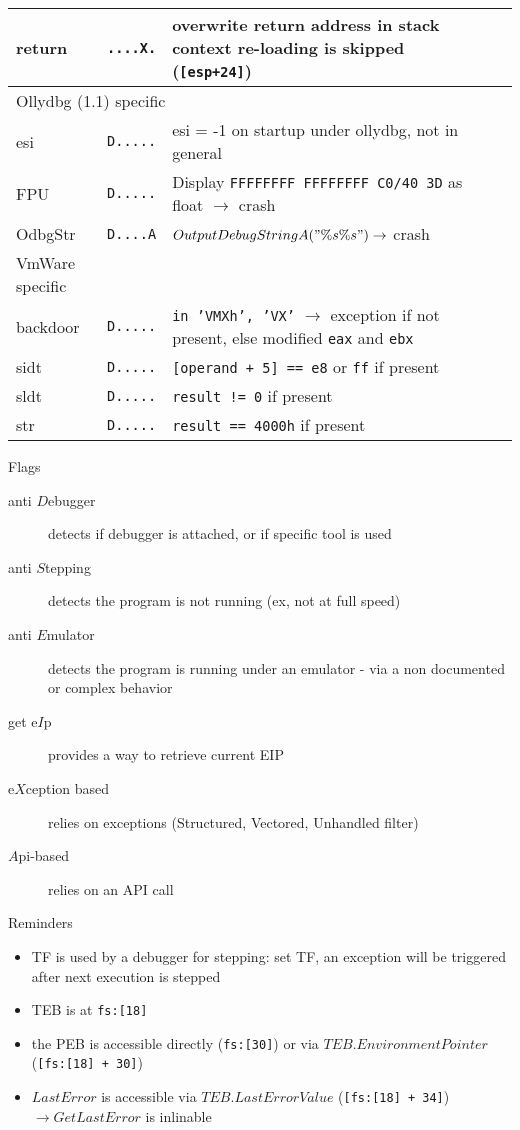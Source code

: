 \begin{tabular}{lllll}
return				& {\tt ....X.} & overwrite return address in stack \ra context re-loading is skipped ({\tt [esp+24]}) \rowcolors{0}{white}{lightgray}
\\
\midrule
\multicolumn{3}{l}{Ollydbg (1.1) specific} \\
\midrule
esi				& {\tt D.....} & esi = -1 on startup under ollydbg, not in general \\
FPU				& {\tt D.....} & Display {\tt FFFFFFFF FFFFFFFF C0/40 3D} as float $\rightarrow$ crash \\
OdbgStr			& {\tt D....A} & $OutputDebugStringA("\%s\%s") \rightarrow$ crash \rowcolors{0}{white}{lightgray}
\\ 
\midrule
VmWare specific \\
\midrule
backdoor			& {\tt D.....} & {\tt in 'VMXh', 'VX'} $\rightarrow$ exception if not present, else modified {\tt eax} and {\tt ebx} \\
sidt				& {\tt D.....} & {\tt [operand + 5] == e8} or {\tt ff} if present \\
sldt				& {\tt D.....} & {\tt result != 0} if present \\
str				& {\tt D.....} & {\tt result == 4000h} if present \rowcolors{0}{white}{lightgray}
\\
\bottomrule
\end{tabular}

\sig

\newpage

{\large Flags}
\begin{description}
\item[anti $D$ebugger]
detects if debugger is attached, or if specific tool is used
\item[anti $S$tepping]
detects the program is not running (ex, not at full speed)
\item[anti $E$mulator]
detects the program is running under an emulator - via a non documented or complex behavior
\item[get e$I$p]
provides a way to retrieve current EIP
\item[e$X$ception based]
relies on exceptions (Structured, Vectored, Unhandled filter)
\item[$A$pi-based]
relies on an API call
\end{description}


{\large Reminders}
\begin{itemize}
\item
TF is used by a debugger for stepping: set TF, an exception will be triggered after next execution is stepped
\item
TEB is at {\tt fs:[18]}
\item
the PEB is accessible directly ({\tt fs:[30]}) or via $TEB.EnvironmentPointer$ ({\tt [fs:[18] + 30]})
\item
$LastError$ is accessible via $TEB.LastErrorValue$ ({\tt [fs:[18] + 34]}) $\rightarrow GetLastError$ is inlinable
\end{itemize}

